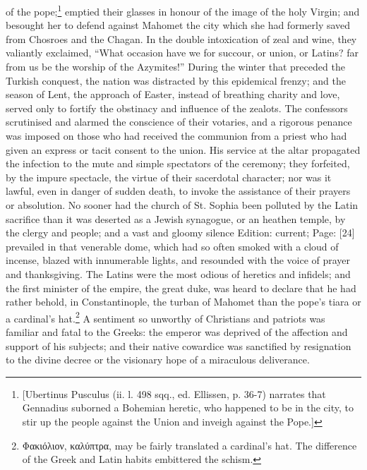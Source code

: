 of the pope;\footnote{[Ubertinus Pusculus (ii. l. 498 sqq., ed. Ellissen, p. 36-7) narrates that Gennadius suborned a Bohemian heretic, who happened to be in the city, to stir up the people against the Union and inveigh against the Pope.]} emptied their glasses in honour of the image of the holy Virgin; and besought her to defend against Mahomet the city which she had formerly saved from Chosroes and the Chagan. In the double intoxication of zeal and wine, they valiantly exclaimed, \texthebrew{“}What occasion have we for succour, or union, or Latins? far from us be the worship of the Azymites!\texthebrew{}” During the winter that preceded the Turkish conquest, the nation was distracted by this epidemical frenzy; and the season of Lent, the approach of Easter, instead of breathing charity and love, served only to fortify the obstinacy and influence of the zealots. The confessors scrutinised and alarmed the conscience of their votaries, and a rigorous penance was imposed on those who had received the communion from a priest who had given an express or tacit consent to the union. His service at the altar propagated the infection to the mute and simple spectators of the ceremony; they forfeited, by the impure spectacle, the virtue of their sacerdotal character; nor was it lawful, even in danger of sudden death, to invoke the assistance of their prayers or absolution. No sooner had the church of St. Sophia been polluted by the Latin sacrifice than it was deserted as a Jewish synagogue, or an heathen temple, by the clergy and people; and a vast and gloomy silence Edition: current; Page: [24] prevailed in that venerable dome, which had so often smoked with a cloud of incense, blazed with innumerable lights, and resounded with the voice of prayer and thanksgiving. The Latins were the most odious of heretics and infidels; and the first minister of the empire, the great duke, was heard to declare that he had rather behold, in Constantinople, the turban of Mahomet than the pope\texthebrew{}’s tiara or a cardinal\texthebrew{}’s hat.\footnote{\textgreek{Φακιόλιον, καλύπτρα}, may be fairly translated a cardinal\texthebrew{}’s hat. The difference of the Greek and Latin habits embittered the schism.} A sentiment so unworthy of Christians and patriots was familiar and fatal to the Greeks: the emperor was deprived of the affection and support of his subjects; and their native cowardice was sanctified by resignation to the divine decree or the visionary hope of a miraculous deliverance.


